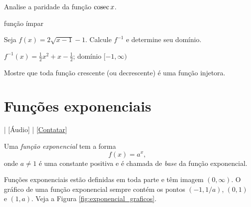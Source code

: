 \begin{exer}
  Analise a paridade da função $\operatorname{cosec} x$.
\end{exer}
\begin{resp}
  função ímpar
\end{resp}

\begin{exer}
  Seja $f(x) = 2\sqrt{x-1}-1$. Calcule $f^{-1}$ e determine seu domínio.
\end{exer}
\begin{resp}
  $f^{-1}(x) = \frac{1}{2}x^2 + x - \frac{1}{2}$; domínio $[-1, \infty)$
\end{resp}

\begin{exer}
  Mostre que toda função crescente (ou decrescente) é uma função injetora.
\end{exer}

\section{Funções exponenciais}\label{cap_funcao_sec_funexp}

\begin{flushright}
  [Vídeo] | [Áudio] | \href{https://phkonzen.github.io/notas/contato.html}{[Contatar]}
\end{flushright}

Uma \emph{função exponencial} tem a forma
\begin{equation}
  f(x) = a^x,
\end{equation}
onde $a\neq 1$ é uma constante positiva e é chamada de \emph{base} da função exponencial.

Funções exponenciais estão definidas em toda parte e têm imagem $(0, \infty)$. O gráfico de uma função exponencial sempre contém os pontos $(-1,1/a)$, $(0,1)$ e $(1,a)$. Veja a Figura \ref{fig:exponencial_graficos}.

